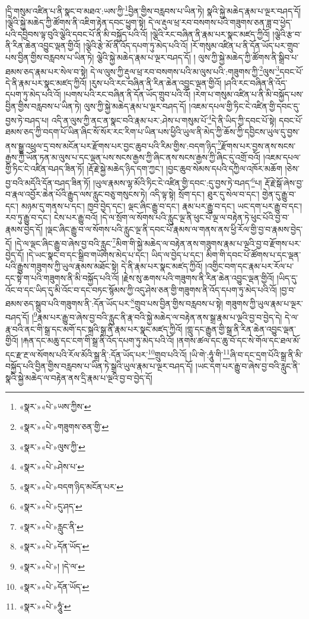 །དྲི་གསུམ་འཛིན་པ་ནི་སྣང་བ་མཐའ་:ཡས་ཀྱི་\footnote{«སྣར་»«པེ་»ཡས་ཀྱིས་}བྱིན་གྱིས་བརླབས་པ་ཡིན་ཏེ། སྣའི་སྐྱེ་མཆེད་རྣམ་པ་ལྔར་བཤད་དོ། །ལྕེའི་སྐྱེ་མཆེད་ཀྱི་ཚོགས་ནི་འཇིག་རྟེན་དབང་ཕྱུག་སྟེ། དེ་ལ་རྡུལ་ཕྲ་རབ་བསགས་པའི་གཟུགས་ཅན་ཟླ་བ་ཕྱེད་པའི་དབྱིབས་ལྟ་བུའི་ལྕེའི་དབང་པོ་ནི་མི་བསྐྱོད་པའི་འོ། །ལྕེའི་རང་བཞིན་ནི་རྣམ་པར་སྣང་མཛད་ཀྱིའོ། །ལྕེའི་རྩ་བ་ནི་རིན་ཆེན་འབྱུང་ལྡན་གྱིའོ། །ལྕེའི་རྩེ་མོ་ནི་འོད་དཔག་ཏུ་མེད་པའི་འོ། །རོ་གསུམ་འཛིན་པ་ནི་དོན་ཡོད་པར་གྲུབ་པས་བྱིན་གྱིས་བརླབས་པ་ཡིན་ཏེ། ལྕེའི་སྐྱེ་མཆེད་རྣམ་པ་ལྔར་བཤད་དོ། །
ལུས་ཀྱི་སྐྱེ་མཆེད་ཀྱི་ཚོགས་ནི་སྒྲིབ་པ་ཐམས་ཅད་རྣམ་པར་སེལ་བ་སྟེ། དེ་ལ་ལུས་ཀྱི་རྡུལ་ཕྲ་རབ་བསགས་པའི་མ་ལུས་པའི་:གཟུགས་ཀྱི་\footnote{«སྣར་»«པེ་»གཟུགས་ཅན་གྱི་}ལུས་\footnote{«སྣར་»«པེ་»ལུས་ཀྱི་}དབང་པོ་དེ་ནི་རྣམ་པར་སྣང་མཛད་ཀྱིའོ། །རུས་པའི་རང་བཞིན་ནི་རིན་ཆེན་འབྱུང་ལྡན་གྱིའོ། །ཤའི་རང་བཞིན་ནི་འོད་དཔག་ཏུ་མེད་པའི་འོ། །པགས་པའི་རང་བཞིན་ནི་དོན་ཡོད་གྲུབ་པའི་འོ། །རེག་པ་གསུམ་འཛིན་པ་ནི་མི་བསྐྱོད་པས་བྱིན་གྱིས་བརླབས་པ་ཡིན་ཏེ། ལུས་ཀྱི་སྐྱེ་མཆེད་རྣམ་པ་ལྔར་བཤད་དོ། །འཇམ་དཔལ་གྱི་ཏིང་ངེ་འཛིན་གྱི་དབང་དུ་བྱས་ཏེ་བཤད་པ། འདི་ན་ལུས་ཀྱི་ནང་ན་སྣང་བའི་རྣམ་པར་:ཤེས་པ་གསུམ་པོ་\footnote{«སྣར་»«པེ་»ཤེས་པ་}དེ་ནི་ཡིད་ཀྱི་དབང་པོ་སྟེ། དབང་པོ་ཐམས་ཅད་ཀྱི་བདག་པོ་ཡིན་ཞིང་སོ་སོར་རང་རིག་པ་ཡིན་པས་ཕྱིའི་ཡུལ་ནི་མེད་ཀྱི་ཆོས་ཀྱི་དབྱིངས་ཡུལ་དུ་བྱས་ནས་སྒྱུ་འཕྲུལ་དྲ་བས་མངོན་པར་རྫོགས་པར་བྱང་ཆུབ་པའི་རིམ་གྱིས་:བདག་ཉིད་\footnote{«སྣར་»«པེ་»བདག་ཉིད་མངོན་པར་}རྫོགས་པར་བྱས་ནས་སངས་རྒྱས་ཀྱི་ཡོན་ཏན་མ་ལུས་པ་དང་ལྡན་པས་སངས་རྒྱས་ཀྱི་ཞིང་ནས་སངས་རྒྱས་ཀྱི་ཞིང་དུ་འགྲོ་བའོ། །འཇམ་དཔལ་གྱི་ཏིང་ངེ་འཛིན་བཤད་ཟིན་ཏོ། །རྡོ་རྗེ་སྐྱེ་མཆེད་ཉིད་དག་ཀྱང་། །བྱང་ཆུབ་སེམས་དཔའི་དཀྱིལ་འཁོར་མཆོག །ཅེས་བྱ་བའི་མདོའི་དོན་བཤད་ཟིན་ཏོ། །ཡུལ་རྣམས་ལྷ་མོའི་ཏིང་ངེ་འཛིན་གྱི་དབང་:དུ་བྱས་ཏེ་བཤད་\footnote{«སྣར་»«པེ་»དུ་ཤད་}པ། རྡོ་རྗེ་སྒོ་ཞེས་བྱ་བ་རྣལ་འབྱོར་ཆེན་པོའི་རྒྱུད་ལས་རླུང་བཅུ་གསུངས་ཏེ། འདི་ལྟ་སྟེ། སྲོག་དང་། ཐུར་དུ་སེལ་བ་དང་། གྱེན་དུ་རྒྱུ་བ་དང་། མཉམ་དུ་གནས་པ་དང་། ཁྱབ་བྱེད་དང་། ལྡང་ཞིང་རྒྱུ་བ་དང་། རྣམ་པར་རྒྱུ་བ་དང་། ཡང་དག་པར་རྒྱུ་བ་དང་། རབ་ཏུ་རྒྱུ་བ་དང་། ངེས་པར་རྒྱུ་བའོ། །དེ་ལ་སྲོག་ལ་སོགས་པའི་རླུང་ལྔ་ནི་ཕུང་པོ་ལྔ་ལ་བརྟེན་ཏེ་ཕུང་པོའི་བྱ་བ་རྣམས་བྱེད་དོ། །ལྡང་ཞིང་རྒྱུ་བ་ལ་སོགས་པའི་རླུང་ལྔ་ནི་དབང་པོ་རྣམས་ལ་གནས་ནས་ཕྱི་རོལ་གྱི་བྱ་བ་རྣམས་བྱེད་དོ། །དེ་ལ་ལྡང་ཞིང་རྒྱུ་བ་ཞེས་བྱ་བའི་རླུང་\footnote{«སྣར་»«པེ་»རླུང་ནི་}མིག་གི་སྐྱེ་མཆེད་ལ་བརྟེན་ནས་གཟུགས་རྣམ་པ་ལྔའི་བྱ་བ་རྫོགས་པར་བྱེད་དོ། །དེ་ཡང་སྣང་བ་དང་སྒྲིབ་གཡོགས་མེད་པ་དང་། ཡིད་ལ་བྱེད་པ་དང་། མིག་གི་དབང་པོ་ཚོགས་པ་དང་ལྡན་པའི་རྒྱུས་གཟུགས་ཀྱི་ཡུལ་རྣམས་མཐོང་སྟེ། དེ་ནི་རྣམ་པར་སྣང་མཛད་ཀྱིའོ། །འགྱིང་བག་དང་རྣམ་པར་རོལ་པ་དང་སྟེ་ག་པའི་གཟུགས་ནི་མི་བསྐྱོད་པའི་འོ། །རྗེས་སུ་ཆགས་པའི་གཟུགས་ནི་རིན་ཆེན་འབྱུང་ལྡན་གྱིའོ། །ཡིད་དུ་འོང་བ་དང་ཡིད་དུ་མི་འོང་བ་དང་བཏང་སྙོམས་ཀྱི་འདུ་ཤེས་ཅན་གྱི་གཟུགས་ནི་འོད་དཔག་ཏུ་མེད་པའི་འོ། །བྱ་བ་ཐམས་ཅད་སྒྲུབ་པའི་གཟུགས་ནི་:དོན་ཡོད་པར་\footnote{«སྣར་»«པེ་»དོན་ཡོད་}གྲུབ་པས་བྱིན་གྱིས་བརླབས་པ་སྟེ། གཟུགས་ཀྱི་ཡུལ་རྣམ་པ་ལྔར་བཤད་དོ། །\footnote{«སྣར་»«པེ་»། །དེ་ལ་}རྣམ་པར་རྒྱུ་བ་ཞེས་བྱ་བའི་རླུང་ནི་རྣ་བའི་སྐྱེ་མཆེད་ལ་བརྟེན་ནས་སྒྲ་རྣམ་པ་ལྔའི་བྱ་བ་བྱེད་དེ། དེ་ལ་རྣ་བའི་ནང་གི་སྒྲ་དང་མགོ་དང་སྐྲའི་སྒྲ་ནི་རྣམ་པར་སྣང་མཛད་ཀྱིའོ། །གླུ་དང་རྒྱུན་གྱི་སྒྲ་ནི་རིན་ཆེན་འབྱུང་ལྡན་གྱིའོ། །རྐན་དང་མཆུ་དང་ངག་གི་སྒྲ་ནི་འོད་དཔག་ཏུ་མེད་པའི་འོ། །ནགས་ཚལ་དང་ཆུ་བོ་དང་སེ་གོལ་དང་ཐལ་མོ་དང་རྫ་རྔ་ལ་སོགས་པའི་རོལ་མོའི་སྒྲ་ནི་:དོན་ཡོད་པར་\footnote{«སྣར་»«པེ་»དོན་ཡོད་}གྲུབ་པའི་འོ། །ཡི་གེ་:ཧཱུཾ་གི་\footnote{«སྣར་»«པེ་»ཧཱུཾ་}ཞི་བ་དང་དྲག་པོའི་སྒྲ་ནི་མི་བསྐྱོད་པའི་བྱིན་གྱིས་བརླབས་པ་ཡིན་ཏེ་སྒྲའི་ཡུལ་རྣམ་པ་ལྔར་བཤད་དོ། །ཡང་དག་པར་རྒྱུ་བ་ཞེས་བྱ་བའི་རླུང་ནི་སྣའི་སྐྱེ་མཆེད་ལ་བརྟེན་ནས་དྲི་རྣམ་པ་ལྔའི་བྱ་བ་བྱེད་དོ། 